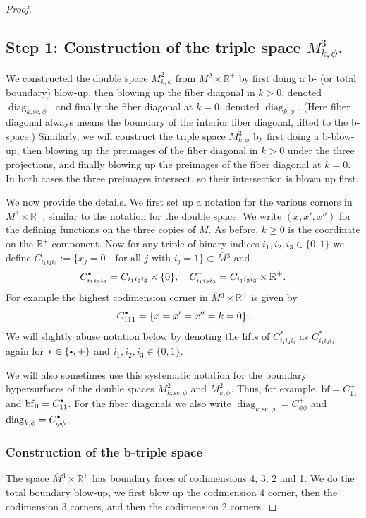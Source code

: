\documentclass[JEP,XML,SOM,Unicode,NoFloatCountersInSection,published]{cedram}
\newcommand{\bbullet}{{\scriptscriptstyle\bullet}}
\newcommand{\sbullet}{{\raisebox{1pt}{$\bbullet$}}}
\theoremstyle{plain}
\theoremstyle{definition}
\newcommand{\R}{{\mathbb{R}}}
\newcommand{\bbf}{{\mathrm{bf}}}
\newcommand{\ssc}{{\mathrm{sc}}}
\DeclareMathOperator\diag{diag}
\newcommand{\Mbar}{{\overline{M}}}\let\M\Mbar
\begin{document}
\begin{proof}
\subsection*{Step 1: Construction of the triple space $M^{3}_{k,\phi}$.}
We constructed the double space $M^2_{k,\phi}$ from $\Mbar{}^2\times\R^+$ by first doing a b- (or total boundary) blow-up, then blowing up the fiber diagonal in $k>0$, denoted $\diag_{k,\ssc,\phi}$, and finally the fiber diagonal at $k=0$, denoted $\diag_{k,\phi}$. (Here fiber diagonal always means the boundary of the interior fiber diagonal, lifted to the b-space.)
Similarly, we will construct the triple space $M^3_{k,\phi}$ by first doing a b-blow-up, then blowing up the preimages of the fiber diagonal in $k>0$ under the three projections, and finally blowing up the preimages of the fiber diagonal at $k=0$. In both cases the three preimages intersect, so their intersection is blown up first.

We now provide the details.
We first set up a notation for the various corners in $\Mbar{}^3\times \R^+$, similar to the notation for the double space. We write $(x,x',x'')$
for the defining functions on the three copies of $\Mbar$. As before, $k\geq 0$ is the coordinate on the
$\R^+$-component.
Now for any triple of binary indices $i_1,i_2,i_3 \in \{0,1\}$ we define
$
C_{i_1i_2i_3} := \{x_j = 0\quad \text{for all $j$ with } i_j = 1\} \subset \Mbar{}^3
$
and
\[
C_{i_1i_2i_3}^\sbullet = C_{i_1i_2i_3}\times \{0\},\quad C_{i_1i_2i_3}^+ = C_{i_1i_2i_3} \times \R^+.
\]
For example the highest codimension corner in $\Mbar{}^3\times \R^+$ is given by
\[
C_{111}^\sbullet = \{ x = x' = x'' = k =0\}.
\]
We will slightly abuse notation below by denoting the lifts of $C_{i_1i_2i_3}^{\ast}$ as $C_{i_1i_2i_3}^{\ast}$ again for $\ast\in\{\sbullet,+\}$ and $i_1,i_2,i_3\in\{0,1\}$.

We will also sometimes use this systematic notation for the boundary hypersurfaces of the double spaces $M^2_{k,\ssc,\phi}$ and $M^2_{k,\phi}$. Thus, for example, $\bbf=C_{11}^+$ and $\bbf_0=C_{11}^\sbullet$. For the fiber diagonals we also write $\diag_{k,\ssc,\phi}=C_{\phi\phi}^+$ and $\diag_{k,\phi}=C_{\phi\phi}^\sbullet$.

\subsubsection* {Construction of the b-triple space}
The space $\Mbar{}^3\times \R^+$ has boundary faces of codimensions 4, 3, 2 and 1. We do the total boundary blow-up, \ie we first blow up the codimension 4 corner, then the codimension 3 corners, and then the codimension 2 corners.


\end{proof}
\end{document}
